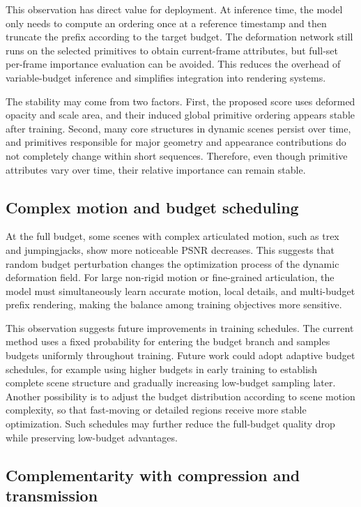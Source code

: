 \documentclass[pdflatex,sn-mathphys]{sn-jnl}
\begin{document}
This observation has direct value for deployment. At inference time, the model only needs to compute an ordering once at a reference timestamp and then truncate the prefix according to the target budget. The deformation network still runs on the selected primitives to obtain current-frame attributes, but full-set per-frame importance evaluation can be avoided. This reduces the overhead of variable-budget inference and simplifies integration into rendering systems.

The stability may come from two factors. First, the proposed score uses deformed opacity and scale area, and their induced global primitive ordering appears stable after training. Second, many core structures in dynamic scenes persist over time, and primitives responsible for major geometry and appearance contributions do not completely change within short sequences. Therefore, even though primitive attributes vary over time, their relative importance can remain stable.

\subsection{Complex motion and budget scheduling}

At the full budget, some scenes with complex articulated motion, such as trex and jumpingjacks, show more noticeable PSNR decreases. This suggests that random budget perturbation changes the optimization process of the dynamic deformation field. For large non-rigid motion or fine-grained articulation, the model must simultaneously learn accurate motion, local details, and multi-budget prefix rendering, making the balance among training objectives more sensitive.

This observation suggests future improvements in training schedules. The current method uses a fixed probability for entering the budget branch and samples budgets uniformly throughout training. Future work could adopt adaptive budget schedules, for example using higher budgets in early training to establish complete scene structure and gradually increasing low-budget sampling later. Another possibility is to adjust the budget distribution according to scene motion complexity, so that fast-moving or detailed regions receive more stable optimization. Such schedules may further reduce the full-budget quality drop while preserving low-budget advantages.

\subsection{Complementarity with compression and transmission}
\end{document}
